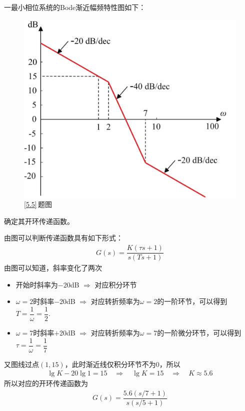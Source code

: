 \vspace*{-2em}
\examples \label{5.5}一最小相位系统的Bode渐近幅频特性图如下：
\begin{figure}[!htb]
	\centering
	\includegraphics[width=0.45\linewidth]{pic/5.5.pdf}
	\caption{\ref{5.5}$\,$题图}
	\label{F5.5}
\end{figure}

确定其开环传递函数。

\solve 由图可以判断传递函数具有如下形式：
\begin{align*}
	G(s) = \dfrac{K(\tau s + 1)}{s(Ts + 1)}
\end{align*}
由图可以知道，斜率变化了两次
\begin{itemize}
	\item 开始时斜率为$-$20dB \quad $\Rightarrow$ \quad 对应积分环节
	\item $\omega = 2$时斜率$-20$dB \quad $\Rightarrow$ \quad 对应转折频率为$\omega = 2$的一阶环节，可以得到$T = \dfrac{1}{\omega} = \dfrac{1}{2}$.
	\item $\omega = 7$时斜率$+$20dB \quad $\Rightarrow$ \quad 对应转折频率为$\omega = 7$的一阶微分环节，可以得到$\tau = \dfrac{1}{\omega} = \dfrac{1}{7}$
\end{itemize}
又图线过点$(1, 15)$，此时渐近线仅积分环节不为0，所以
\begin{align*}
	\lg K - 20\lg 1 = 15 \quad \Rightarrow \quad \lg K = 15 \quad \Rightarrow \quad K \approx 5.6
\end{align*}
所以对应的开环传递函数为
\begin{align*}
	G(s) = \dfrac{5.6(s/7 + 1)}{s(s/5 + 1)}
\end{align*}
\vspace*{-2em}

